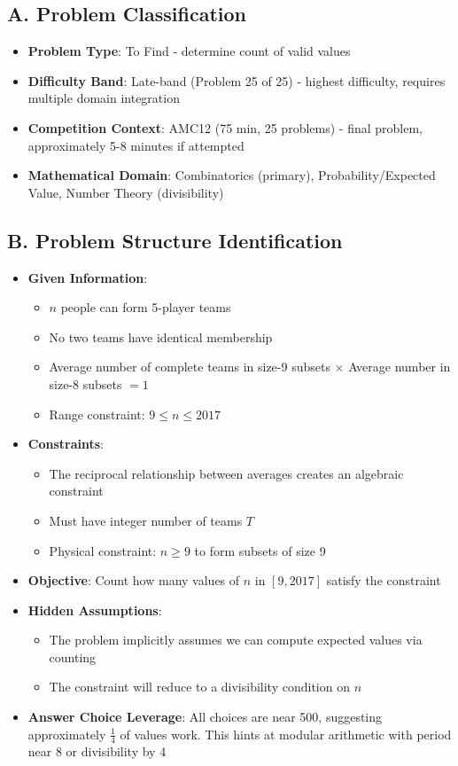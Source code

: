\documentclass[]{article}
\begin{document}
	\begin{problemconfigbox}
		\subsection*{A. Problem Classification}
		\begin{itemize}[leftmargin=*]
			\item \textbf{Problem Type}: To Find - determine count of valid values
			\item \textbf{Difficulty Band}: Late-band (Problem 25 of 25) - highest difficulty, requires multiple domain integration
			\item \textbf{Competition Context}: AMC12 (75 min, 25 problems) - final problem, approximately 5-8 minutes if attempted
			\item \textbf{Mathematical Domain}: Combinatorics (primary), Probability/Expected Value, Number Theory (divisibility)
		\end{itemize}
		
		\subsection*{B. Problem Structure Identification}
		\begin{itemize}[leftmargin=*]
			\item \textbf{Given Information}: 
			\begin{itemize}
				\item $n$ people can form 5-player teams
				\item No two teams have identical membership
				\item Average number of complete teams in size-9 subsets $\times$ Average number in size-8 subsets $= 1$
				\item Range constraint: $9 \leq n \leq 2017$
			\end{itemize}
			\item \textbf{Constraints}: 
			\begin{itemize}
				\item The reciprocal relationship between averages creates an algebraic constraint
				\item Must have integer number of teams $T$
				\item Physical constraint: $n \geq 9$ to form subsets of size 9
			\end{itemize}
			\item \textbf{Objective}: Count how many values of $n$ in $[9, 2017]$ satisfy the constraint
			\item \textbf{Hidden Assumptions}: 
			\begin{itemize}
				\item The problem implicitly assumes we can compute expected values via counting
				\item The constraint will reduce to a divisibility condition on $n$
			\end{itemize}
			\item \textbf{Answer Choice Leverage}: All choices are near 500, suggesting approximately $\frac{1}{4}$ of values work. This hints at modular arithmetic with period near 8 or divisibility by 4
		\end{itemize}
		

\end{problemconfigbox}
\end{document}
